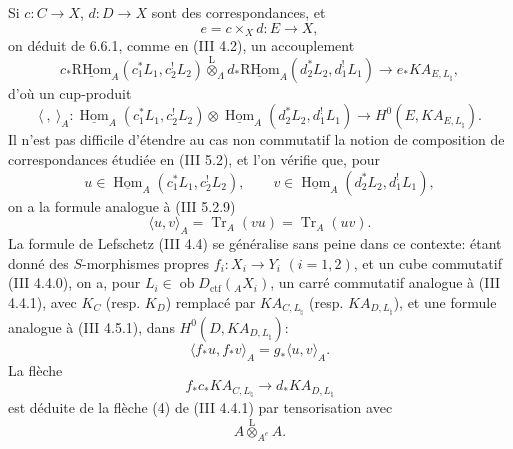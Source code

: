 \documentclass[11pt]{article}
\DeclareMathOperator{\Hom}{Hom}
\newcommand{\R}{\mathrm{R}}\newcommand{\RHomCore}{\mathrm{RHom}}
\providecommand{\RHom}{\RHomCore}
\providecommand{\uRHom}{\underline{\RHom}}
\providecommand{\uHom}{\underline{\Hom}}
\providecommand{\Tr}{\operatorname{Tr}}
\providecommand{\Tr}{\operatorname{Tr}}
\providecommand{\lten}{\overset{\mathrm L}{\otimes}}
\providecommand{\Ob}{\operatorname{ob}}
\providecommand{\Tr}{\operatorname{Tr}}
\providecommand{\RHom}{\RHomCore}
\providecommand{\Hom}{\operatorname{Hom}}
\providecommand{\lten}{\overset{\mathrm L}{\otimes}}
\providecommand{\RHom}{\R\mathcal{H}om}
\providecommand{\lten}{\overset{\mathrm L}{\otimes}}
\providecommand{\Ob}{\operatorname{ob}}
\providecommand{\R}{\mathrm R}
\providecommand{\Tr}{\operatorname{Tr}}
\providecommand{\lten}{\overset{\mathrm L}{\otimes}}
\providecommand{\lten}{\overset{\mathrm L}{\otimes}}
\providecommand{\Ob}{\operatorname{Ob}}
\providecommand{\lten}{\overset{\mathrm L}{\otimes}}
\providecommand{\RHom}{\RHomCore}
\providecommand{\Hom}{\operatorname{Hom}}
\providecommand{\Tr}{\operatorname{Tr}}
\providecommand{\Ob}{\operatorname{ob}}
\providecommand{\Ob}{\operatorname{Ob}}
\providecommand{\lten}{\overset{\mathrm L}{\otimes}}
\begin{document}
Si $c:C\to X$, $d:D\to X$ sont des correspondances, et
\[
e=c\times_Xd:E\to X,
\]
on déduit de 6.6.1, comme en (III 4.2), un accouplement
\begin{equation}
c_*\uRHom_A(c_1^*L_1,c_2^!L_2)
\lten_{\Lambda}
d_*\uRHom_A(d_2^*L_2,d_1^!L_1)
\longrightarrow
e_*KA_{E,L_{\natural}},
\tag{6.6.2}
\end{equation}
d'où un cup-produit
\begin{equation}
\langle\ ,\ \rangle_A:
\uHom_A(c_1^*L_1,c_2^!L_2)\otimes
\uHom_A(d_2^*L_2,d_1^!L_1)
\longrightarrow
H^0(E,KA_{E,L_{\natural}}).
\tag{6.6.3}
\end{equation}
Il n'est pas difficile d'étendre au cas non commutatif la notion de composition de correspondances étudiée en (III 5.2), et l'on vérifie que, pour
\[
u\in\uHom_A(c_1^*L_1,c_2^!L_2),\qquad
v\in\uHom_A(d_2^*L_2,d_1^!L_1),
\]
on a la formule analogue à (III 5.2.9)
\begin{equation}
\langle u,v\rangle_A=\Tr_A(vu)=\Tr_A(uv).
\tag{6.6.4}
\end{equation}
La formule de Lefschetz (III 4.4) se généralise sans peine dans ce contexte: étant donné des $S$-morphismes propres $f_i:X_i\to Y_i$ $(i=1,2)$, et un cube commutatif (III 4.4.0), on a, pour $L_i\in\Ob D_{\mathrm{ctf}}({}_AX_i)$, un carré commutatif analogue à (III 4.4.1), avec $K_C$ (resp. $K_D$) remplacé par $KA_{C,L_{\natural}}$ (resp. $KA_{D,L_{\natural}}$), et une formule analogue à (III 4.5.1), dans $H^0(D,KA_{D,L_{\natural}})$:
\begin{equation}
\langle f_*u,f_*v\rangle_A=g_*\langle u,v\rangle_A.
\tag{6.6.5}
\end{equation}
La flèche
\[
f_*c_*KA_{C,L_{\natural}}\longrightarrow d_*KA_{D,L_{\natural}}
\]
est déduite de la flèche (4) de (III 4.4.1) par tensorisation avec
\[
A\lten_{A^e}A .
\]
\end{document}
